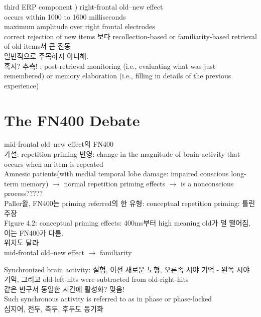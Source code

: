 \documentclass[../note.tex]{subfiles}
\begin{document}
third ERP component ) right-frontal old–new effect\\
occurs within 1000 to 1600 milliseconds\\
maximum amplitude over right frontal electrodes\\
correct rejection of new items 보다 recollection-based or familiarity-based retrieval of old items서 큰 진동\\
일반적으로 주목하지 아니해.\\
혹시? 추측! : post-retrieval
monitoring (i.e., evaluating what was just remembered) or memory
elaboration (i.e., filling in details of the previous experience)\\

\section{The FN400 Debate}
mid-frontal old–new effect의 FN400\\
가설: repetition priming 반영: change in the magnitude of brain activity that occurs when an item is repeated\\
Amnesic patients(with medial temporal lobe damage: impaired conscious long-term memory) $\rightarrow$ normal repetition priming effects
$\rightarrow$ is a nonconscious process?????\\

Paller왈, FN400는 priming referred의 한 유형: conceptual repetition
priming: 틀린 주장\\
Figure 4.2: conceptual priming effects: 400ms부터 high meaning old가 덜 떨어짐, 이는 FN400가 다름.\\
위치도 달라\\
mid-frontal old–new effect $\rightarrow$ familiarity

Synchronized brain activity: 실험, 이전 새로운 도형, 오른족 시야 기억 - 왼쪽 시야 기억, 그리고 old-left-hits were subtracted from old-right-hits\\
같은 반구서 동일한 시간에 활성화? 맞음!\\
Such synchronous activity is referred to
as in phase or phase-locked\\
심지어, 전두, 측두, 후두도 동기화\\
\end{document}
